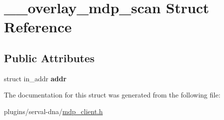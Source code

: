 \hypertarget{struct____overlay__mdp__scan}{\section{\-\_\-\-\_\-overlay\-\_\-mdp\-\_\-scan Struct Reference}
\label{struct____overlay__mdp__scan}
}
\subsection*{Public Attributes}
\begin{DoxyCompactItemize}
\item 
\hypertarget{struct____overlay__mdp__scan_a13ce0dc38b81f4c6e0cd82900742ce16}{struct in\-\_\-addr {\bfseries addr}}\label{struct____overlay__mdp__scan_a13ce0dc38b81f4c6e0cd82900742ce16}

\end{DoxyCompactItemize}


The documentation for this struct was generated from the following file\-:\begin{DoxyCompactItemize}
\item 
plugins/serval-\/dna/\hyperlink{mdp__client_8h}{mdp\-\_\-client.\-h}\end{DoxyCompactItemize}

